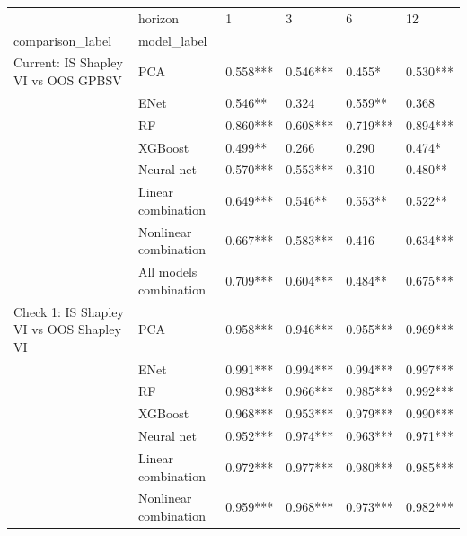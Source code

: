 \begin{tabular}{llllll}
\toprule
                                                         & horizon &        1  &        3  &        6  &        12 \\
comparison\_label & model\_label &           &           &           &           \\
\midrule
Current: IS Shapley VI vs OOS GPBSV & PCA &  0.558*** &  0.546*** &    0.455* &  0.530*** \\
                                                         & ENet &   0.546** &     0.324 &   0.559** &     0.368 \\
                                                         & RF &  0.860*** &  0.608*** &  0.719*** &  0.894*** \\
                                                         & XGBoost &   0.499** &     0.266 &     0.290 &    0.474* \\
                                                         & Neural net &  0.570*** &  0.553*** &     0.310 &   0.480** \\
                                                         & Linear combination &  0.649*** &   0.546** &   0.553** &   0.522** \\
                                                         & Nonlinear combination &  0.667*** &  0.583*** &     0.416 &  0.634*** \\
                                                         & All models combination &  0.709*** &  0.604*** &   0.484** &  0.675*** \\
Check 1: IS Shapley VI vs OOS Shapley VI & PCA &  0.958*** &  0.946*** &  0.955*** &  0.969*** \\
                                                         & ENet &  0.991*** &  0.994*** &  0.994*** &  0.997*** \\
                                                         & RF &  0.983*** &  0.966*** &  0.985*** &  0.992*** \\
                                                         & XGBoost &  0.968*** &  0.953*** &  0.979*** &  0.990*** \\
                                                         & Neural net &  0.952*** &  0.974*** &  0.963*** &  0.971*** \\
                                                         & Linear combination &  0.972*** &  0.977*** &  0.980*** &  0.985*** \\
                                                         & Nonlinear combination &  0.959*** &  0.968*** &  0.973*** &  0.982*** \\

\end{tabular}

